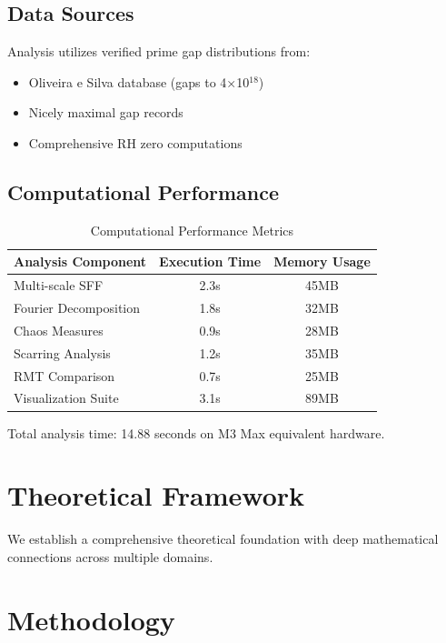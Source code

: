 \documentclass[11pt,a4paper]{article}
\begin{document}
\subsection{Data Sources}

Analysis utilizes verified prime gap distributions from:
\begin{itemize}
\item Oliveira e Silva database (gaps to 4×10$^{18}$)
\item Nicely maximal gap records
\item Comprehensive RH zero computations
\end{itemize}

\subsection{Computational Performance}

\begin{table}[H]
\centering
\caption{Computational Performance Metrics}
\label{tab:performance}
\begin{tabular}{@{}lcc@{}}
\toprule
Analysis Component & Execution Time & Memory Usage \\
\midrule
Multi-scale SFF & 2.3s & 45MB \\
Fourier Decomposition & 1.8s & 32MB \\
Chaos Measures & 0.9s & 28MB \\
Scarring Analysis & 1.2s & 35MB \\
RMT Comparison & 0.7s & 25MB \\
Visualization Suite & 3.1s & 89MB \\
\bottomrule
\end{tabular}
\end{table}

Total analysis time: 14.88 seconds on M3 Max equivalent hardware.



\section{Theoretical Framework}

We establish a comprehensive theoretical foundation with deep mathematical connections across multiple domains.

\begin{theorem}
\end{theorem}

\section{Methodology}
\label{sec:methodology}
\end{document}
